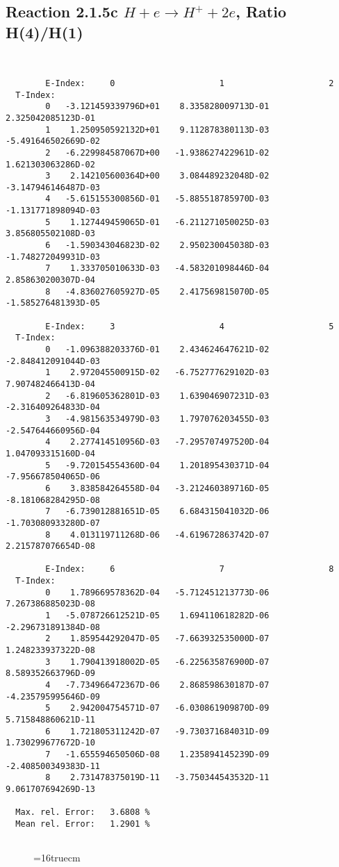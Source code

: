 \documentclass[12pt]{article}
\begin{document}
\newpage
\subsection{
Reaction 2.1.5c  $H + e \rightarrow H^+ + 2e$, Ratio H(4)/H(1)
}


\begin{small}\begin{verbatim}


        E-Index:     0                     1                     2
  T-Index:
        0   -3.121459339796D+01    8.335828009713D-01    2.325042085123D-01
        1    1.250950592132D+01    9.112878380113D-03   -5.491646502669D-02
        2   -6.229984587067D+00   -1.938627422961D-02    1.621303063286D-02
        3    2.142105600364D+00    3.084489232048D-02   -3.147946146487D-03
        4   -5.615155300856D-01   -5.885518785970D-03   -1.131771898094D-03
        5    1.127449459065D-01   -6.211271050025D-03    3.856805502108D-03
        6   -1.590343046823D-02    2.950230045038D-03   -1.748272049931D-03
        7    1.333705010633D-03   -4.583201098446D-04    2.858630200307D-04
        8   -4.836027605927D-05    2.417569815070D-05   -1.585276481393D-05

        E-Index:     3                     4                     5
  T-Index:
        0   -1.096388203376D-01    2.434624647621D-02   -2.848412091044D-03
        1    2.972045500915D-02   -6.752777629102D-03    7.907482466413D-04
        2   -6.819605362801D-03    1.639046907231D-03   -2.316409264833D-04
        3   -4.981563534979D-03    1.797076203455D-03   -2.547644660956D-04
        4    2.277414510956D-03   -7.295707497520D-04    1.047093315160D-04
        5   -9.720154554360D-04    1.201895430371D-04   -7.956678504065D-06
        6    3.838584264558D-04   -3.212460389716D-05   -8.181068284295D-08
        7   -6.739012881651D-05    6.684315041032D-06   -1.703080933280D-07
        8    4.013119711268D-06   -4.619672863742D-07    2.215787076654D-08

        E-Index:     6                     7                     8
  T-Index:
        0    1.789669578362D-04   -5.712451213773D-06    7.267386885023D-08
        1   -5.078726612521D-05    1.694110618282D-06   -2.296731891384D-08
        2    1.859544292047D-05   -7.663932535000D-07    1.248233937322D-08
        3    1.790413918002D-05   -6.225635876900D-07    8.589352663796D-09
        4   -7.734966472367D-06    2.868598630187D-07   -4.235795995646D-09
        5    2.942004754571D-07   -6.030861909870D-09    5.715848860621D-11
        6    1.721805311242D-07   -9.730371684031D-09    1.730299677672D-10
        7   -1.655594650506D-08    1.235894145239D-09   -2.408500349383D-11
        8    2.731478375019D-11   -3.750344543532D-11    9.061707694269D-13

  Max. rel. Error:   3.6808 %
  Mean rel. Error:   1.2901 %


\end{verbatim}\end{small}
\begin{figure} \label{2.1.5c}
\epsfxsize=16truecm
\end{figure}
\end{document}
